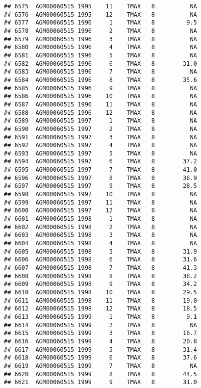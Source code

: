 \documentclass{article}\usepackage[]{graphicx}\usepackage[]{color}
\makeatletter
\newenvironment{kframe}{%
 \def\at@end@of@kframe{}%
 \ifinner\ifhmode%
  \def\at@end@of@kframe{\end{minipage}}%
  \begin{minipage}{\columnwidth}%
 \fi\fi%
 \def\FrameCommand##1{\hskip\@totalleftmargin \hskip-\fboxsep
 \colorbox{shadecolor}{##1}\hskip-\fboxsep
     \hskip-\linewidth \hskip-\@totalleftmargin \hskip\columnwidth}%
 \MakeFramed {\advance\hsize-\width
   \@totalleftmargin\z@ \linewidth\hsize
   \@setminipage}}%
 {\par\unskip\endMakeFramed%
 \at@end@of@kframe}
\newenvironment{knitrout}{}{} %
\makeatother
\begin{document}
\begin{knitrout}
\begin{kframe}
\begin{verbatim}
## 6575  AGM00060515 1995    11    TMAX   8          NA
## 6576  AGM00060515 1995    12    TMAX   8          NA
## 6577  AGM00060515 1996     1    TMAX   8         9.5
## 6578  AGM00060515 1996     2    TMAX   8          NA
## 6579  AGM00060515 1996     3    TMAX   8          NA
## 6580  AGM00060515 1996     4    TMAX   8          NA
## 6581  AGM00060515 1996     5    TMAX   8          NA
## 6582  AGM00060515 1996     6    TMAX   8        31.0
## 6583  AGM00060515 1996     7    TMAX   8          NA
## 6584  AGM00060515 1996     8    TMAX   8        35.6
## 6585  AGM00060515 1996     9    TMAX   8          NA
## 6586  AGM00060515 1996    10    TMAX   8          NA
## 6587  AGM00060515 1996    11    TMAX   8          NA
## 6588  AGM00060515 1996    12    TMAX   8          NA
## 6589  AGM00060515 1997     1    TMAX   8          NA
## 6590  AGM00060515 1997     2    TMAX   8          NA
## 6591  AGM00060515 1997     3    TMAX   8          NA
## 6592  AGM00060515 1997     4    TMAX   8          NA
## 6593  AGM00060515 1997     5    TMAX   8          NA
## 6594  AGM00060515 1997     6    TMAX   8        37.2
## 6595  AGM00060515 1997     7    TMAX   8        41.0
## 6596  AGM00060515 1997     8    TMAX   8        38.9
## 6597  AGM00060515 1997     9    TMAX   8        28.5
## 6598  AGM00060515 1997    10    TMAX   8          NA
## 6599  AGM00060515 1997    11    TMAX   8          NA
## 6600  AGM00060515 1997    12    TMAX   8          NA
## 6601  AGM00060515 1998     1    TMAX   8          NA
## 6602  AGM00060515 1998     2    TMAX   8          NA
## 6603  AGM00060515 1998     3    TMAX   8          NA
## 6604  AGM00060515 1998     4    TMAX   8          NA
## 6605  AGM00060515 1998     5    TMAX   8        31.9
## 6606  AGM00060515 1998     6    TMAX   8        31.6
## 6607  AGM00060515 1998     7    TMAX   8        41.3
## 6608  AGM00060515 1998     8    TMAX   8        38.2
## 6609  AGM00060515 1998     9    TMAX   8        34.2
## 6610  AGM00060515 1998    10    TMAX   8        29.5
## 6611  AGM00060515 1998    11    TMAX   8        19.0
## 6612  AGM00060515 1998    12    TMAX   8        18.5
## 6613  AGM00060515 1999     1    TMAX   8         9.1
## 6614  AGM00060515 1999     2    TMAX   8          NA
## 6615  AGM00060515 1999     3    TMAX   8        16.7
## 6616  AGM00060515 1999     4    TMAX   8        20.8
## 6617  AGM00060515 1999     5    TMAX   8        31.4
## 6618  AGM00060515 1999     6    TMAX   8        37.6
## 6619  AGM00060515 1999     7    TMAX   8          NA
## 6620  AGM00060515 1999     8    TMAX   8        44.5
## 6621  AGM00060515 1999     9    TMAX   8        31.0

\end{verbatim}
\end{kframe}
\end{knitrout}
\end{document}
